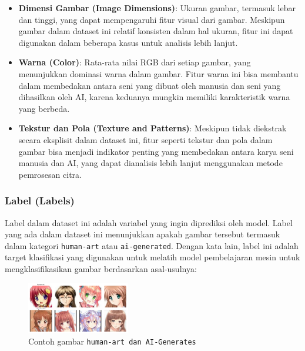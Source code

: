 \documentclass[12pt,a4paper]{article}
\begin{document}
\begin{itemize}
    \item \textbf{Dimensi Gambar (Image Dimensions)}: Ukuran gambar, termasuk lebar dan tinggi, yang dapat mempengaruhi fitur visual dari gambar. Meskipun gambar dalam dataset ini relatif konsisten dalam hal ukuran, fitur ini dapat digunakan dalam beberapa kasus untuk analisis lebih lanjut.
    
    \item \textbf{Warna (Color)}: Rata-rata nilai RGB dari setiap gambar, yang menunjukkan dominasi warna dalam gambar. Fitur warna ini bisa membantu dalam membedakan antara seni yang dibuat oleh manusia dan seni yang dihasilkan oleh AI, karena keduanya mungkin memiliki karakteristik warna yang berbeda.
    
    \item \textbf{Tekstur dan Pola (Texture and Patterns)}: Meskipun tidak diekstrak secara eksplisit dalam dataset ini, fitur seperti tekstur dan pola dalam gambar bisa menjadi indikator penting yang membedakan antara karya seni manusia dan AI, yang dapat dianalisis lebih lanjut menggunakan metode pemrosesan citra.
\end{itemize}
  
\subsubsection{Label (Labels)}
    Label dalam dataset ini adalah variabel yang ingin diprediksi oleh model. Label yang ada dalam dataset ini menunjukkan apakah gambar tersebut termasuk dalam kategori \texttt{human-art} atau \texttt{ai-generated}. Dengan kata lain, label ini adalah target klasifikasi yang digunakan untuk melatih model pembelajaran mesin untuk mengklasifikasikan gambar berdasarkan asal-usulnya:
    \begin{figure}[h]
        \centering
        \includegraphics[width=0.4\textwidth]{anime.png}  %
        \caption{Contoh gambar \texttt{human-art dan AI-Generates}}
    \end{figure}
    
\newpage
\end{document}
